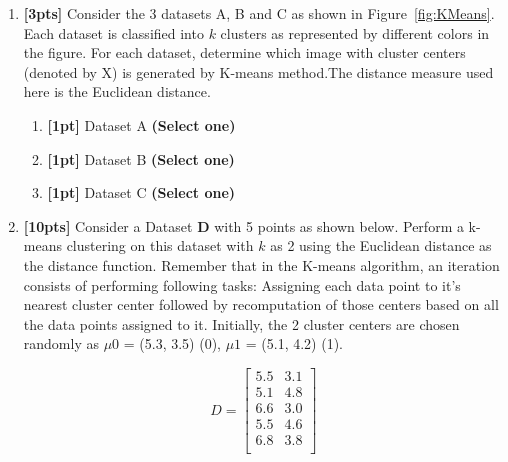\documentclass[12pt]{article}
\renewcommand{\circle}{\tikz\draw[black] (0,0) circle (1ex);}
\begin{document}
 \begin{enumerate}
 \item \textbf{[3pts]} Consider the 3 datasets A, B and C as shown in Figure~\ref{fig:KMeans}. Each dataset is classified into $k$ clusters as represented by different colors in the figure. For each dataset, determine which image with cluster centers (denoted by X) is generated by K-means method.The distance measure used here is the Euclidean distance.
 \begin{enumerate}[label*=\arabic*.]
    \item \textbf{[1pt]} Dataset A \textbf{(Select one)}
    
    
    \item \textbf{[1pt]} Dataset B \textbf{(Select one)}

    
    \item \textbf{[1pt]} Dataset C \textbf{(Select one)}


    
 \end{enumerate}
 \item \textbf{[10pts]} Consider a Dataset $\textbf{D}$ with 5 points as shown below. Perform a k-means clustering on this dataset with $k$ as 2 using the Euclidean distance as the distance function.
 Remember that in the K-means algorithm, an iteration consists of performing following tasks: Assigning each data point to it's nearest cluster center followed by recomputation of those centers based on all the data points assigned to it. Initially, the 2 cluster centers are chosen randomly as $\mu0$ = (5.3, 3.5) (0), $\mu1$ = (5.1, 4.2) (1).
 
\[
D=\begin{bmatrix}
5.5&3.1\\
5.1&4.8\\
6.6&3.0\\
5.5&4.6\\
6.8&3.8\\
\end{bmatrix}
\]


\end{enumerate}
\end{document}
